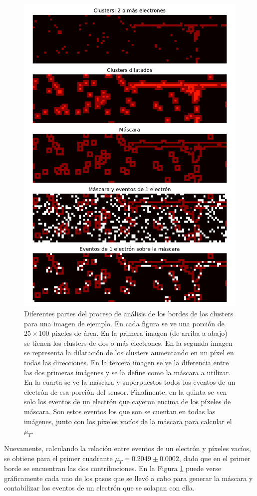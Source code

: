 \begin{figure}[H]
    \centering
    \includegraphics[scale=0.65]{Figs/analisis_bordes.pdf}
    \caption{Diferentes partes del proceso de análisis de los bordes de los clusters para una imagen de ejemplo. En cada figura se ve una porción de $25 \times 100$ píxeles de área. En la primera imagen (de arriba a abajo) se tienen los clusters de dos o más electrones. En la segunda imagen se representa la dilatación de los clusters aumentando en un píxel en todas las direcciones. En la tercera imagen se ve la diferencia entre las dos primeras imágenes y se la define como la máscara a utilizar. En la cuarta se ve la máscara y superpuestos todos los eventos de un electrón de esa porción del sensor. Finalmente, en la quinta se ven solo los eventos de un electrón que cayeron encima de los píxeles de máscara. Son estos eventos los que son se cuentan en todas las imágenes, junto con los píxeles vacíos de la máscara para calcular el $\mu_{T}$.}
    \label{fig:AnalisisBordes}
\end{figure}
Nuevamente, calculando la relación entre eventos de un electrón y píxeles vacíos, se obtiene para el primer cuadrante $\mu_{T} = 0.2049 \pm 0.0002$, dado que en el primer borde se encuentran las dos contribuciones. En la Figura \ref{fig:AnalisisBordes} puede verse gráficamente cada uno de los pasos que se llevó a cabo para generar la máscara y contabilizar los eventos de un electrón que se solapan con ella.

